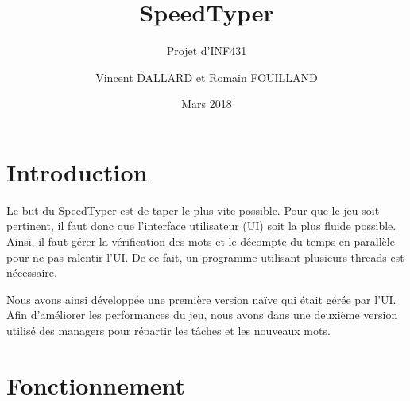 \documentclass[a4paper,11pt]{article}
\title{SpeedTyper}
\author{Vincent DALLARD et Romain FOUILLAND}
\subtitle{Projet d'INF431}
\date{Mars 2018}
\begin{document}
\maketitle
\section{Introduction}
Le but du SpeedTyper est de taper le plus vite possible. Pour que le jeu soit pertinent, il faut donc que l'interface utilisateur (UI) soit la plus fluide possible. Ainsi, il faut gérer la vérification des mots et le décompte du temps en parallèle pour ne pas ralentir l'UI. De ce fait, un programme utilisant plusieurs threads est nécessaire.\par
Nous avons ainsi développée une première version naïve qui était gérée par l'UI. Afin d'améliorer les performances du jeu, nous avons dans une deuxième version utilisé des managers pour répartir les tâches et les nouveaux mots.\par

\section{Fonctionnement}
\end{document}
